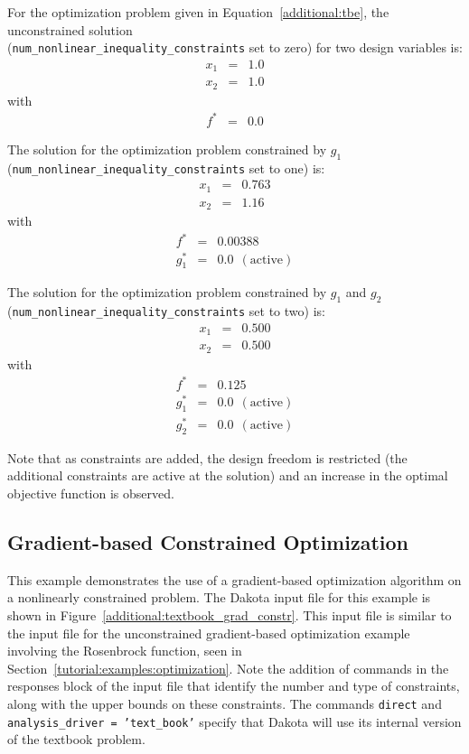 For the optimization problem given in Equation~\ref{additional:tbe}, the
unconstrained solution\\(\texttt{num\_nonlinear\_inequality\_constraints}
set to zero) for two design variables is:
\begin{eqnarray*}
    x_1 &=& 1.0 \\
    x_2 &=& 1.0
\end{eqnarray*}
with
\begin{eqnarray*}
    f^{\ast} &=& 0.0
\end{eqnarray*}

The solution for the optimization problem constrained by $g_1$\\
(\texttt{num\_nonlinear\_inequality\_constraints} set to one) is:
\begin{eqnarray*}
    x_1 &=& 0.763 \\
    x_2 &=& 1.16
\end{eqnarray*}
with
\begin{eqnarray*}
      f^{\ast} &=& 0.00388 \\
    g_1^{\ast} &=& 0.0 ~~\mathrm{(active)}
\end{eqnarray*}

The solution for the optimization problem constrained by $g_1$ and $g_2$\\
(\texttt{num\_nonlinear\_inequality\_constraints} set to two) is:
\begin{eqnarray*}
    x_1 &=& 0.500 \\
    x_2 &=& 0.500
\end{eqnarray*}
with
\begin{eqnarray*}
      f^{\ast} &=& 0.125 \\
    g_1^{\ast} &=& 0.0 ~~\mathrm{(active)} \\
    g_2^{\ast} &=& 0.0 ~~\mathrm{(active)}
\end{eqnarray*}

Note that as constraints are added, the design freedom is restricted
(the additional constraints are active at the solution) and an
increase in the optimal objective function is observed.

\subsection{Gradient-based Constrained Optimization}\label{additional:textbook:examples:gradient2}

This example demonstrates the use of a gradient-based optimization
algorithm on a nonlinearly constrained problem. The
Dakota input file for this example is
shown in Figure~\ref{additional:textbook_grad_constr}. This
input file is similar to the input file for the unconstrained
gradient-based optimization example involving the Rosenbrock
function, seen in Section~\ref{tutorial:examples:optimization}.
Note the addition of commands in the responses block of
the input file that identify the number and type of constraints, along
with the upper bounds on these constraints. The commands
\texttt{direct} and \texttt{analysis\_driver = 'text\_book'} specify
that Dakota will use its internal version of the textbook problem.

